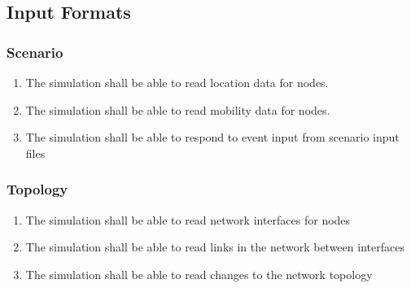 \documentclass[titlepage]{article}
\begin{document}

\subsection{Input Formats%
  \label{input-formats}%
}

\subsubsection{Scenario}
\begin{enumerate}
        \item The simulation shall be able to read location data for nodes.
		\item The simulation shall be able to read mobility data for nodes.
		\item The simulation shall be able to respond to event input from scenario input files
\end{enumerate}

\subsubsection{Topology}
\begin{enumerate}
    \item The simulation shall be able to read network interfaces for nodes
    \item The simulation shall be able to read links in the network between interfaces
    \item The simulation shall be able to read changes to the network topology
\end{enumerate}

\end{document}
